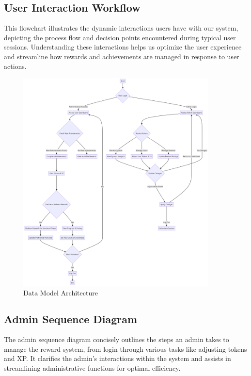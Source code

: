 \subsection{User Interaction Workflow}
This flowchart illustrates the dynamic interactions users have with our system, depicting the process flow and decision points encountered during typical user sessions. Understanding these interactions helps us optimize the user experience and streamline how rewards and achievements are managed in response to user actions.

 \begin{figure}[H]
    \centering
    \includegraphics[width=0.9\textwidth]{src/assets/chapters/Reward-System_Activity-Flow.png}
    \caption{ Data Model Architecture}
    \label{fig:reward_system_architecture_overview}
\end{figure}

\subsection{Admin Sequence Diagram}
The admin sequence diagram concisely outlines the steps an admin takes to manage the reward system, from login through various tasks like adjusting tokens and XP. It clarifies the admin's interactions within the system and assists in streamlining administrative functions for optimal efficiency.


